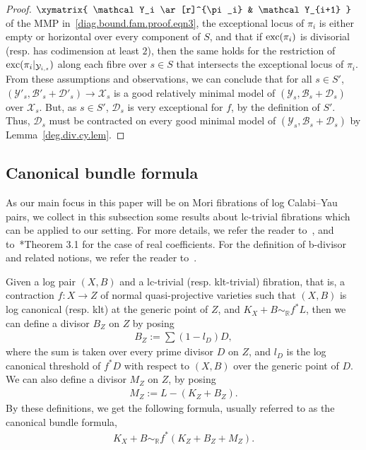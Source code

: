 \documentclass[11pt]{ip-journal}
\theoremstyle{definition}
\begin{document}
\begin{proof}
$\xymatrix{
\mathcal Y_i \ar[r]^{\pi_i} & 
\mathcal Y_{i+1}
}$
of the MMP in~\eqref{diag.bound.fam.proof.eqn3}, the exceptional locus of 
$\pi_i$ 
is either empty or horizontal over every component of 
$S$, 
and that if 
${\rm exc}(\pi_i)$ 
is divisorial (resp. has codimension at least $2$), then the same holds for the restriction of 
${\rm exc}(\pi_i\vert_{\mathcal Y_{i, s}})$ 
along each fibre over 
$s \in S$ 
that intersects the exceptional locus of 
$\pi_i$. 
From these assumptions and observations, we can conclude that for all 
$s \in S'$, 
$(\mathcal{Y}'_s, \mathcal{B}'_s+\mathcal{D}'_s) \to \mathcal{X}_s$ 
is a good relatively minimal model of 
$(\mathcal{Y}_s, \mathcal{B}_s + \mathcal{D}_s)$ 
over 
$\mathcal{X}_s$.
But, as 
$s \in S'$, 
$\mathcal D_s$ is very exceptional for $f$, by the definition of $S'$.
Thus,
$\mathcal D_s$ 
must be contracted on every good minimal model of 
$(\mathcal Y_s, \mathcal B_s+\mathcal D_s)$
by Lemma~\ref{deg.div.cy.lem}.
\end{proof}

\subsection{Canonical bundle formula}
\label{sect.cbf}

As our main focus in this paper will be on Mori fibrations of log Calabi--Yau pairs, we collect in this subsection some results about lc-trivial fibrations which can be applied to our setting. 
For more details, we refer the reader to~\cites{MR2153078, MR2134273}, and to~\cite{MR2944479}*{Theorem 3.1} for the case of real coefficients.   
For the definition of b-divisor and related notions, we refer the reader to~\cite{bir-zh}.

Given a log pair $(X,B)$ and a lc-trivial (resp. klt-trivial) fibration, that is, a contraction $f \colon X \to Z$ of normal quasi-projective varieties such that $(X, B)$ is log canonical (resp. klt) at the generic point of $Z$, and $K_X + B \sim_\mathbb{R} f^* L$, then we can define a divisor $B_Z$ on $Z$ by posing 
\begin{align}
\label{def.bound.part.eqn}
B_Z := \sum (1-l_D) D,
\end{align} 
where the sum is taken over every prime divisor $D$ on $Z$, and $l_D$ is the log canonical threshold of $f^*D$ with respect to $(X,B)$ over the generic point of $D$.
We can also define a divisor $M_Z$ on $Z$, by posing
\begin{align}
\label{def.moduli.part.eqn}
M_Z := L-(K_Z+B_Z).
\end{align}
By these definitions, we get the following formula, usually referred to as the canonical bundle formula, 
\begin{align}
\label{cbf.def.eqn}
K_{X}+B \sim _{\mathbb{R}} f^*(K_{Z}+B_{Z}+M_{Z}).
\end{align}
\end{document}
